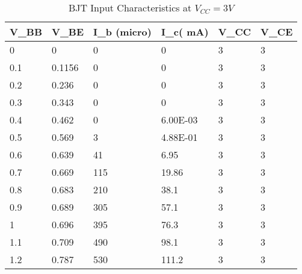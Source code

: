 \documentclass{scrartcl}
\newcommand{\1}{\mathbbm{1}}
\begin{document}
    \begin{table}[!ht]
        \centering
        \begin{tabular}{|l|l|l|l|l|l|}
        \hline
            \textbf{V\_BB} & \textbf{V\_BE} & \textbf{I\_b (micro)} & \textbf{I\_c( mA)} & \textbf{V\_CC} & \textbf{V\_CE} \\ \hline
            0 & 0 & 0 & 0 & 3 & 3 \\ \hline
            0.1 & 0.1156 & 0 & 0 & 3 & 3 \\ \hline
            0.2 & 0.236 & 0 & 0 & 3 & 3 \\ \hline
            0.3 & 0.343 & 0 & 0 & 3 & 3 \\ \hline
            0.4 & 0.462 & 0 & 6.00E-03 & 3 & 3 \\ \hline
            0.5 & 0.569 & 3 & 4.88E-01 & 3 & 3 \\ \hline
            0.6 & 0.639 & 41 & 6.95 & 3 & 3 \\ \hline
            0.7 & 0.669 & 115 & 19.86 & 3 & 3 \\ \hline
            0.8 & 0.683 & 210 & 38.1 & 3 & 3 \\ \hline
            0.9 & 0.689 & 305 & 57.1 & 3 & 3 \\ \hline
            1 & 0.696 & 395 & 76.3 & 3 & 3 \\ \hline
            1.1 & 0.709 & 490 & 98.1 & 3 & 3 \\ \hline
            1.2 & 0.787 & 530 & 111.2 & 3 & 3 \\ \hline
        \end{tabular}
        \caption{BJT Input Characteristics at $V_{CC} = 3V$}
        \label{tab:input3v}
    \end{table}
\end{document}
